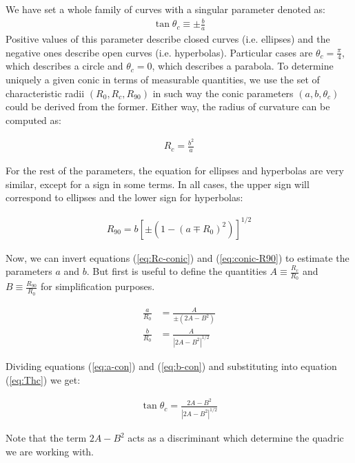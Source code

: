 We have set a whole family of curves with a singular parameter denoted as:
\begin{align}
  \tan\theta_c \equiv \pm\frac{b}{a}\label{eq:Thc}
\end{align}
Positive values of this parameter describe closed curves (i.e. ellipses) and the negative ones describe open curves (i.e. hyperbolas).
Particular cases are $\theta_c =\frac{\pi}{4}$,
which describes a circle and $\theta_c=0$, which describes a parabola.
To determine uniquely a given conic in terms of measurable quantities, we use the set of characteristic radii $(R_0,R_c,R_{90})$ in such way the conic
parameters $(a,b,\theta_c)$ could be derived from the former. Either way, the radius of curvature can be computed as:

\begin{align}
R_c = \frac{b^2}{a} \label{eq:Rc-conic}
\end{align}

For the rest of the parameters, the equation for ellipses and hyperbolas are very similar, except for a sign in some terms. In all cases, the upper sign will
correspond to ellipses and the lower sign for hyperbolas:

\begin{align}
R_{90} = b\left[\pm \left(1-\left(a\mp R_0\right)^2\right)\right]^{1/2}\label{eq:conic-R90}
\end{align}


Now, we can invert equations (\ref{eq:Rc-conic}) and (\ref{eq:conic-R90}) to estimate the parameters $a$ and $b$.
But first is useful to define the quantities $A \equiv \frac{R_c}{R_0}$ and $B\equiv \frac{R_{90}}{R_0}$ for simplification purposes.

\begin{align}
  \frac{a}{R_0} &= \frac{A}{\pm\left(2A-B^2\right)} \label{eq:a-con}\\
  \frac{b}{R_0} &= \frac{A}{\left|2A-B^2\right|^{1/2}} \label{eq:b-con}
\end{align}


Dividing equations (\ref{eq:a-con}) and (\ref{eq:b-con}) and substituting into equation (\ref{eq:Thc}) we get:

\begin{align}
\tan\theta_c = \frac{2A-B^2}{\left|2A-B^2\right|^{1/2}} \label{eq:th_c}
\end{align}

Note that the term $2A-B^2$ acts as a discriminant which determine the quadric we are working with.

